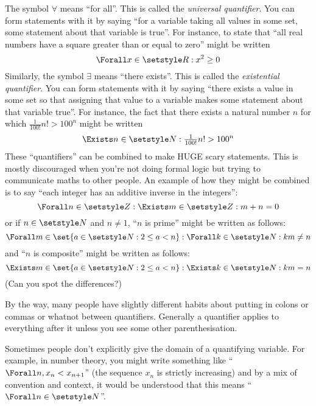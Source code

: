 The symbol \(\forall\) means ``for all''. This is called the \emph{universal
quantifier}. You can form statements with it by saying ``for a variable taking
all values in some set, some statement about that variable is true''. For
instance, to state that ``all real numbers have a square greater than or equal
to zero'' might be written
\begin{equation*}
 \Forall x \in \Reals : x^2 \ge 0
\end{equation*}
Similarly, the symbol \(\exists\) means ``there exists''. This is called the
\emph{existential quantifier}. You can form statements with it by saying ``there
exists a value in some set so that assigning that value to a variable makes some
statement about that variable true''. For instance, the fact that there exists a
natural number $n$ for which \(\frac 1{100!}n! > 100^n\) might be written
\begin{equation*}
 \Exists n \in \Naturals : \tfrac 1{100!}n! > 100^n
\end{equation*}
These ``quantifiers'' can be combined to make {\large HUGE} scary statements.
This is mostly discouraged when you're not doing formal logic but trying to
communicate maths to other people. An example of how they might be combined is
to say ``each integer has an additive inverse in the integers'':
\begin{equation*}
 \Forall n \in \Integers : \Exists m \in \Integers : m + n = 0
\end{equation*}
or if \(n \in \Naturals\) and \(n \ne 1\), ``\(n\) is prime'' might be written
as follows:
\begin{equation*}
 \Forall m \in \set{a \in \Naturals : 2 \le a < n} :
 \Forall k \in \Naturals :
 km \ne n
\end{equation*}
and ``\(n\) is composite'' might be written as follows:
\begin{equation*}
 \Exists m \in \set{a \in \Naturals : 2 \le a < n} :
 \Exists k \in \Naturals :
 km = n
\end{equation*}
(Can you spot the differences?)

By the way, many people have slightly different habits about putting in colons
or commas or whatnot between quantifiers. Generally a quantifier applies to
everything after it unless you see some other parenthesisation.

Sometimes people don't explicitly give the domain of a quantifying variable. For
example, in number theory, you might write something like
``\(\Forall n, x_n < x_{n + 1}\)'' (the sequence \(x_n\) is strictly increasing)
and by a mix of convention and context, it would be understood that this means
``\(\Forall n \in \Naturals\)''.

